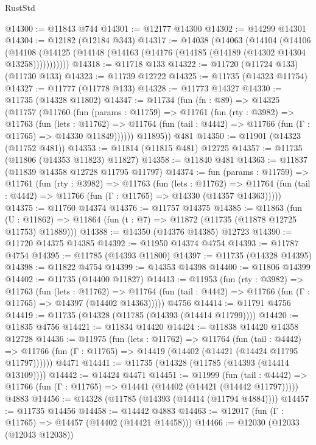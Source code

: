 \begin{lexlean}{RustStd}
\begin{coremodule}
@14300 := @11843 @744
@14301 := @12177 @14300
@14302 := @14299 @14301
@14304 := @12182 (@12184 @343)
@14317 := @14038
    (@14063
      (@14104
        (@14106
          (@14108 (@14125 (@14148 (@14163 (@14176 (@14185 (@14189 (@14302 @14304 @13258)))))))))))
@14318 := @11718 @133
@14322 := @11720 (@11724 @133) (@11730 @133)
@14323 := @11739 @12722
@14325 := @11735 (@14323 @11754)
@14327 := @11777 (@11778 @133)
@14328 := @11773 @14327
@14330 := @11735 (@14328 @11802)
@14347 := @11734
    (fun (fn : @89) =>
    @14325
      (@11757
        (@11760
          (fun (params : @11759) =>
          @11761
            (fun (rty : @3982) =>
            @11763
              (fun (lets : @11762) =>
              @11764 (fun (tail : @4442) => @11766 (fun (Γ : @11765) => @14330 @11849))))))
        @11895))
    @481
@14350 := @11901 (@14323 (@11752 @481))
@14353 := @11814 (@11815 @481) @12725
@14357 := @11735 (@11806 (@14353 @11823) @11827)
@14358 := @11840 @481
@14363 := @11837 (@11839 @14358 @12728 @11795 @11797)
@14374 := fun (params : @11759) =>
  @11761
    (fun (rty : @3982) =>
    @11763
      (fun (lets : @11762) =>
      @11764 (fun (tail : @4442) => @11766 (fun (Γ : @11765) => @14330 (@14357 @14363)))))
@14375 := @11760 @14374
@14376 := @11757 @14375
@14385 := @11863
    (fun (U : @11862) => @11864 (fun (t : @7) => @11872 (@11735 (@11878 @12725 @11753) @11889)))
@14388 := @14350 (@14376 @14385) @12723
@14390 := @11720 @14375 @14385
@14392 := @11950 @14374 @4754
@14393 := @11787 @4754
@14395 := @11785 (@14393 @11800)
@14397 := @11735 (@14328 @14395)
@14398 := @11822 @4754
@14399 := @14353 @14398
@14400 := @11806 @14399
@14402 := @11735 (@14400 @11827)
@14413 := @11953
    (fun (rty : @3982) =>
    @11763
      (fun (lets : @11762) =>
      @11764 (fun (tail : @4442) => @11766 (fun (Γ : @11765) => @14397 (@14402 @14363)))))
    @4756
@14414 := @11791 @4756
@14419 := @11735 (@14328 (@11785 (@14393 (@14414 @11799))))
@14420 := @11835 @4756
@14421 := @11834 @14420
@14424 := @11838 @14420 @14358 @12728
@14436 := @11975
    (fun (lets : @11762) =>
    @11764
      (fun (tail : @4442) =>
      @11766 (fun (Γ : @11765) => @14419 (@14402 (@14421 (@14424 @11795 @11797))))))
    @4471
@14441 := @11735 (@14328 (@11785 (@14393 (@14414 @13109))))
@14442 := @14424 @4471
@14451 := @11999
    (fun (tail : @4442) => @11766 (fun (Γ : @11765) => @14441 (@14402 (@14421 (@14442 @11797)))))
    @4883
@14456 := @14328 (@11785 (@14393 (@14414 (@11794 @4884))))
@14457 := @11735 @14456
@14458 := @14442 @4883
@14463 := @12017 (fun (Γ : @11765) => @14457 (@14402 (@14421 @14458)))
@14466 := @12030 (@12033 (@12043 @12038))

\end{coremodule}
\end{lexlean}
